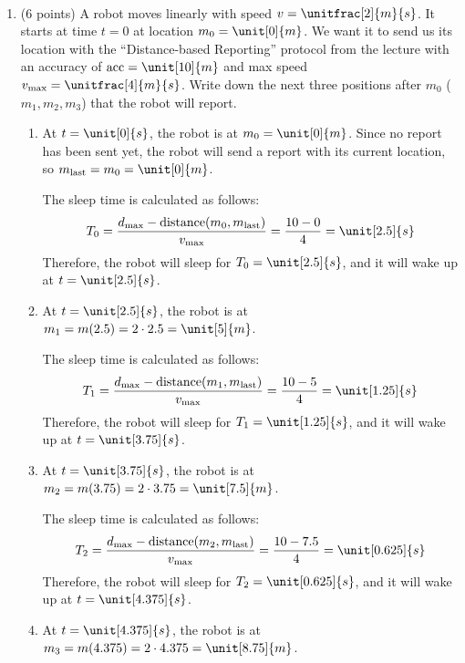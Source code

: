 \documentclass[12pt]{article}
\begin{document}
    \newpage

    \begin{ejercicio}[14 points]
        ~
        \begin{enumerate}[label=\alph*)]
            \item\label{itm:robot}
                (6 points) A robot moves linearly with speed $v = \unitfrac[2]{m}{s}$. It starts at time $t = 0$ at location $m_0 = \unit[0]{m}$. We want it to send us its location with the ``Distance-based Reporting'' protocol from the lecture with an accuracy of $\text{acc} = \unit[10]{m}$ and max speed $v_{\max} = \unitfrac[4]{m}{s}$. Write down the next three positions after $m_0$ ($m_1, m_2, m_3$) that the robot will report.
                \begin{enumerate}
                    \item At $t=\unit[0]{s}$, the robot is at $m_0 = \unit[0]{m}$. Since no report has been sent yet, the robot will send a report with its current location, so $m_{\text{last}} = m_0 = \unit[0]{m}$.
                    
    
                    The sleep time is calculated as follows:
                    \begin{equation*}
                        T_0 = \frac{d_{\max} - \text{distance}(m_0, m_{\text{last}})}{v_{\max}} = \frac{10 - 0}{4} = \unit[2.5]{s}
                    \end{equation*}
                    Therefore, the robot will sleep for $T_0 = \unit[2.5]{s}$, and it will wake up at $t = \unit[2.5]{s}$.
                    \item At $t=\unit[2.5]{s}$, the robot is at $m_1=m(2.5)=2\cdot 2.5 = \unit[5]{m}$. 
                    
                    The sleep time is calculated as follows:
                    \begin{equation*}
                        T_1 = \frac{d_{\max} - \text{distance}(m_1, m_{\text{last}})}{v_{\max}} = \frac{10 - 5}{4} = \unit[1.25]{s}
                    \end{equation*}
                    Therefore, the robot will sleep for $T_1 = \unit[1.25]{s}$, and it will wake up at $t = \unit[3.75]{s}$.
                    \item At $t=\unit[3.75]{s}$, the robot is at $m_2=m(3.75)=2\cdot 3.75 = \unit[7.5]{m}$.
                    
                    The sleep time is calculated as follows:
                    \begin{equation*}
                        T_2 = \frac{d_{\max} - \text{distance}(m_2, m_{\text{last}})}{v_{\max}} = \frac{10 - 7.5}{4} = \unit[0.625]{s}
                    \end{equation*}
                    Therefore, the robot will sleep for $T_2 = \unit[0.625]{s}$, and it will wake up at $t = \unit[4.375]{s}$.
                    \item At $t=\unit[4.375]{s}$, the robot is at $m_3=m(4.375)=2\cdot 4.375 = \unit[8.75]{m}$.
                    

\end{enumerate}
\end{enumerate}
\end{ejercicio}
\end{document}
